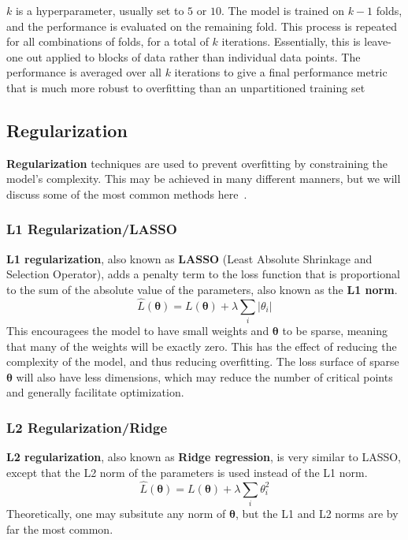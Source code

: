 \documentclass[12pt]{report}
\theoremstyle{definition}
\theoremstyle{remark}
\begin{document}
$k$ is a hyperparameter, usually set to $5$ or $10$. The model is trained on $k-1$ folds, and the performance is evaluated on the remaining fold. This process is repeated for all combinations of folds, for a total of $k$ iterations. Essentially, this is leave-one out applied to blocks of data rather than individual data points. The performance is averaged over all $k$ iterations to give a final performance metric that is much more robust to overfitting than an unpartitioned training set

\subsection{Regularization}

\textbf{Regularization} techniques are used to prevent overfitting by constraining the model's complexity. This may be achieved in many different manners, but we will discuss some of the most common methods here~\cite{bishop_deep_2023}.


\subsubsection{L1 Regularization/LASSO}
\textbf{L1 regularization}, also known as \textbf{LASSO} (Least Absolute Shrinkage and Selection Operator), adds a penalty term to the loss function that is proportional to the sum of the absolute value of the parameters, also known as the \textbf{L1 norm}.
\begin{equation}
    \hat{L}(\boldsymbol{\theta}) = L(\boldsymbol{\theta}) + \lambda \sum_i |\theta_i|
\end{equation}
This encouragees the model to have small weights and $\boldsymbol{\theta}$ to be sparse, meaning that many of the weights will be exactly zero. This has the effect of reducing the complexity of the model, and thus reducing overfitting. The loss surface of sparse $\boldsymbol{\theta}$ will also have less dimensions, which may reduce the number of critical points and generally facilitate optimization.

\subsubsection{L2 Regularization/Ridge}
\textbf{L2 regularization}, also known as \textbf{Ridge regression}, is very similar to LASSO, except that the L2 norm of the parameters is used instead of the L1 norm.
\begin{equation}
    \hat{L}(\boldsymbol{\theta}) = L(\boldsymbol{\theta}) + \lambda \sum_i \theta_i^2
\end{equation}
Theoretically, one may subsitute any norm of $\boldsymbol{\theta}$, but the L1 and L2 norms are by far the most common.
\end{document}

